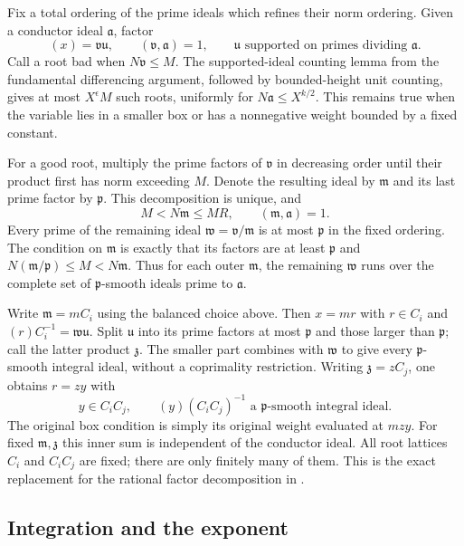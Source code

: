 \documentclass[11pt,reqno]{amsart}
\numberwithin{equation}{section}
\theoremstyle{definition}
\begin{document}
Fix a total ordering of the prime ideals which refines their norm ordering.
Given a conductor ideal $\mathfrak a$, factor
\[
 (x)=\mathfrak v\mathfrak u,
 \qquad (\mathfrak v,\mathfrak a)=1,
 \qquad \mathfrak u\text{ supported on primes dividing }\mathfrak a.
\]
Call a root bad when $N\mathfrak v\le M$.  The supported-ideal counting
lemma from the fundamental differencing argument, followed by bounded-height
unit counting, gives at most $X^\epsilon M$ such roots, uniformly for
$N\mathfrak a\le X^{k/2}$.  This remains true when the variable lies in
a smaller box or has a nonnegative weight bounded by a fixed constant.

For a good root, multiply the prime factors of $\mathfrak v$ in decreasing
order until their product first has norm exceeding $M$.  Denote the
resulting ideal by $\mathfrak m$ and its last prime factor by $\mathfrak p$.
This decomposition is unique, and
\[
 M<N\mathfrak m\le MR,\qquad
 (\mathfrak m,\mathfrak a)=1.
\]
Every prime of the remaining ideal $\mathfrak w=\mathfrak v/\mathfrak m$
is at most $\mathfrak p$ in the fixed ordering.  The condition on
$\mathfrak m$ is exactly that its factors are at least $\mathfrak p$ and
$N(\mathfrak m/\mathfrak p)\le M<N\mathfrak m$.
Thus for each outer $\mathfrak m$, the remaining $\mathfrak w$ runs over
the complete set of $\mathfrak p$-smooth ideals prime to $\mathfrak a$.

Write $\mathfrak m=m C_i$ using the balanced choice above.  Then $x=mr$
with $r\in C_i$ and
$(r)C_i^{-1}=\mathfrak w\mathfrak u$.
Split $\mathfrak u$ into its prime factors at most $\mathfrak p$ and those
larger than $\mathfrak p$; call the latter product $\mathfrak z$.
The smaller part combines with $\mathfrak w$ to give every
$\mathfrak p$-smooth integral ideal, without a coprimality restriction.
Writing $\mathfrak z=z C_j$, one obtains $r=zy$ with
\[
 y\in C_iC_j,
 \qquad (y)(C_iC_j)^{-1}\text{ a }\mathfrak p\text{-smooth integral ideal}.
\]
The original box condition is simply its original weight evaluated at
$mzy$.  For fixed $\mathfrak m,\mathfrak z$ this inner sum is independent
of the conductor ideal.  All root lattices $C_i$ and $C_iC_j$ are fixed;
there are only finitely many of them.  This is the exact replacement for
the rational factor decomposition in \cite[\S\S3--4]{BW2023}.

\subsection{Integration and the exponent}
\end{document}
